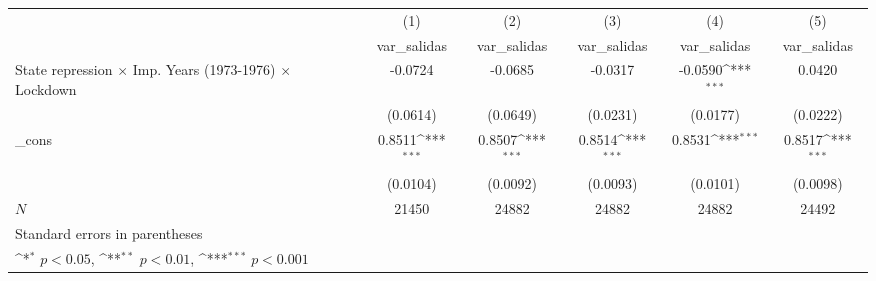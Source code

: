 {
\def\sym#1{\ifmmode^{#1}\else\(^{#1}\)\fi}
\begin{tabular}{l*{5}{c}}
\hline\hline
            &\multicolumn{1}{c}{(1)}&\multicolumn{1}{c}{(2)}&\multicolumn{1}{c}{(3)}&\multicolumn{1}{c}{(4)}&\multicolumn{1}{c}{(5)}\\
            &\multicolumn{1}{c}{var\_salidas}&\multicolumn{1}{c}{var\_salidas}&\multicolumn{1}{c}{var\_salidas}&\multicolumn{1}{c}{var\_salidas}&\multicolumn{1}{c}{var\_salidas}\\
\hline
State repression $\times$ Imp. Years (1973-1976) $\times$ Lockdown&     -0.0724         &     -0.0685         &     -0.0317         &     -0.0590\sym{***}&      0.0420         \\
            &    (0.0614)         &    (0.0649)         &    (0.0231)         &    (0.0177)         &    (0.0222)         \\
[1em]
\_cons      &      0.8511\sym{***}&      0.8507\sym{***}&      0.8514\sym{***}&      0.8531\sym{***}&      0.8517\sym{***}\\
            &    (0.0104)         &    (0.0092)         &    (0.0093)         &    (0.0101)         &    (0.0098)         \\
\hline
\(N\)       &       21450         &       24882         &       24882         &       24882         &       24492         \\
\hline\hline
\multicolumn{6}{l}{\footnotesize Standard errors in parentheses}\\
\multicolumn{6}{l}{\footnotesize \sym{*} \(p<0.05\), \sym{**} \(p<0.01\), \sym{***} \(p<0.001\)}\\
\end{tabular}
}
